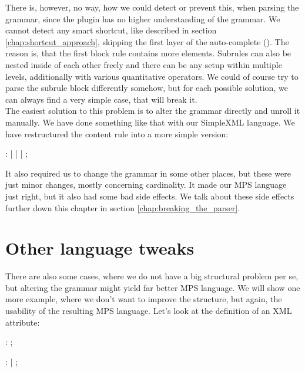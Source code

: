 There is, however, no way, how we could detect or prevent this, when parsing the grammar, since the plugin has no higher understanding of the grammar.
We cannot detect any smart shortcut, like described in section \ref{chap:shortcut_approach}, skipping the first layer of the auto-complete ().
The reason is, that the first block rule contains more elements.
Subrules can also be nested inside of each other freely and there can be any setup within multiple levels, additionally with various quantitative operators.
We could of course try to parse the subrule block differently somehow, but for each possible solution, we can always find a very simple case, that will break it.
\\

The easiest solution to this problem is to alter the grammar directly and unroll it manually.
We have done something like that with our SimpleXML language.
We have restructured the content rule into a more simple version:

\begin{antlr}
	    :   
	           |   
	           |   
	           |   
	           ;
\end{antlr}

It also required us to change the grammar in some other places, but these were just minor changes, mostly concerning cardinality.
It made our MPS language just right, but it also had some bad side effects.
We talk about these side effects further down this chapter in section \ref{chap:breaking_the_parser}.

\section{Other language tweaks}

There are also some cases, where we do not have a big structural problem per se, but altering the grammar might yield far better MPS language.
We will show one more example, where we don't want to improve the structure, but again, the usability of the resulting MPS language.
Let's look at the definition of an XML attribute:

\begin{antlr}
	   :    \literal{=}  ;

	      :    \regex{~["]*} 
	            |    \regex{~[']*} 
	            ;
\end{antlr}

